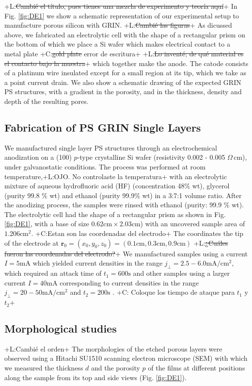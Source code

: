 \documentclass{article}
\newcommand{\notaL}[1]{{\color{blue}+L:#1+}}
\newcommand{\notaC}[1]{{\color{green}+C:#1+}}
\begin{document}
\notaL{\sout{Cambié el título, pues tienes una mezcla de experimento y
  teoría aquí}}
In Fig. \ref{fig:DE1} we show a schematic representation of our
experimental setup to manufacture porous silicon with GRIN.
\notaL{\sout{Cambié las figuras}}
As dicussed above, we fabricated an electrolytic cell with the shape of a
rectangular prism on the bottom of which we place a Si wafer which makes
electrical contact to a metal plate \notaC{\sout{gold plate} error de escritura} 
\notaL{\sout{Lo inventé; de qué material es el contacto bajo la muestra}}
 which together make the anode. The catode consists of a platinum wire 
 insulated except for a small region at its tip, which we take as a 
 point current drain.
We also show a schematic drawing of the expected GRIN PS structures,
with a gradient in the porosity, and in the thickness, density and depth
of the resulting pores.

\subsection{Fabrication of PS  GRIN Single Layers}
\label{sec:fabrication-ps-grin}
We manufactured single layer PS structures through an electrochemical
anodization on a (100) $p$-type crystalline Si wafer
(resistivity 0.002 - 0.005 $ \Omega\,\text{cm}$), under galvanostatic
conditions. The process was performed at
room temperature,\notaL{OJO. No controlaste la temperatura} with an
electrolytic mixture of aqueous hydrofluoric
acid (HF) (concentration 48\% wt), glycerol (purity 99.8 \% wt) and
ethanol (purity 99.9\% wt) in a 3:7:1 volume ratio. After the
anodizing process, the samples were rinsed with
ethanol (purity: 99.9 $ \% $  wt). The electrolytic cell had the shape
of a rectangular prism as shown in Fig. \ref{fig:DE1}, with a base of
size $0.62\text{cm}\times2.03\text{cm}$) with an uncovered sample area
of $1.206\text{cm}^2$. \notaC{Estan son las coordenadas del electrodo} 
The coordinates the tip of the electrode at $\bm
r_0=(x_0,y_0,z_0)=(0.1\text{cm},0.3\text{cm},0.9\text{cm})$
\notaL{\sout{¿Cuáles fueron las coordenadas del
  electrodo?}} We manufactured samples using a current $I=5\text{mA}$
which yielded current densities in the range
$j_\perp=2.5-6.0\text{mA}/\text{cm}^2$, which required an attack time of
$t_1=600 \text{s}$ and other samples using a larger
current $I=40\text{mA}$ corresponding to current densities in the
range $j_\perp=20-50\text{mA}/\text{cm}^2$ and $t_2=200 \text{s}$ . \notaC{
Coloque los tiempo de ataque para $t_1$ y $t_2$}
\subsection{Morphological studies}
\label{sec:morph-stud}
\notaL{Cambié el orden}
The morphologies of the etched porous layers were
observed using a Hitachi SU1510 scanning electron microscope (SEM)
with which we measured the thickness $d$ and the porosity $p$ of the
films at different positions along the sample from its top and side
views (Fig. \ref{fig:DE1}).
\end{document}
